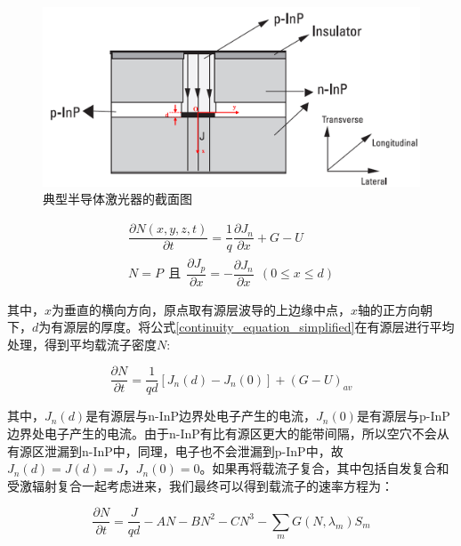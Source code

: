 \begin{figure}[htb]
	\centering
	\includegraphics[width=14cm]{./Pictures/laser_activelayer.jpg}
	\captionsetup{justification=centering}
	\caption{典型半导体激光器的截面图\cite{morthier2013handbook}}
	\label{laser_activelayer}
\end{figure}

\begin{equation}
\label{continuity_equation_simplified}
\begin{array}{l}
\dfrac{\partial N(x,y,z,t)}{\partial t} = \dfrac{1}{q}\dfrac{\partial J_{n}}{\partial x}+G-U\\
N = P ~~\text{且}~~ \dfrac{\partial J_{p}}{\partial x} = -\dfrac{\partial J_{n}}{\partial x}~~(0 \le x \le d)
\end{array}
\end{equation}

其中，$x$为垂直的横向方向，原点取有源层波导的上边缘中点，$x$轴的正方向朝下，$d$为有源层的厚度。将公式\ref{continuity_equation_simplified}在有源层进行平均处理，得到平均载流子密度$N$:

\begin{equation}
\label{average_carrier_density}
\dfrac{\partial N}{\partial t} = \dfrac{1}{qd}[J_{n}(d)-J_{n}(0)]+(G-U)_{av}
\end{equation}

其中，$J_{n}(d)$是有源层与n-InP边界处电子产生的电流，$J_{n}(0)$是有源层与p-InP边界处电子产生的电流。由于n-InP有比有源区更大的能带间隔，所以空穴不会从有源区泄漏到n-InP中，同理，电子也不会泄漏到p-InP中，故$J_{n}(d)=J(d)=J$，$J_{n}(0)=0$。如果再将载流子复合，其中包括自发复合和受激辐射复合一起考虑进来，我们最终可以得到载流子的速率方程为：

\begin{equation}
\label{carrier_density_rate_equation}
\dfrac{\partial N}{\partial t} = \dfrac{J}{qd}-AN-BN^{2}-CN^{3}-\sum_{m}G(N,\lambda_{m})S_{m}
\end{equation}


